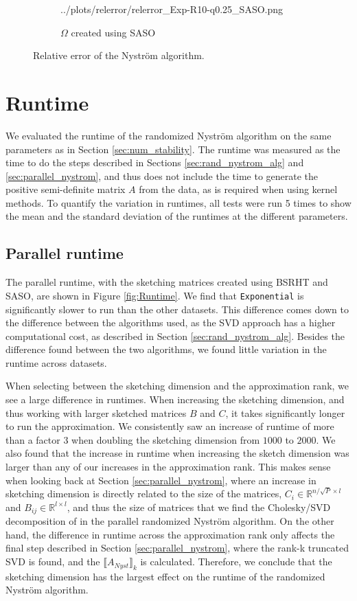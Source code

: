 \documentclass{article}
\theoremstyle{definition}
\begin{document}
\begin{figure}
\begin{subfigure}[t]{0.4\textwidth}
        {../plots/relerror/relerror_Exp-R10-q0.25_SASO.png}
    \caption{$\Omega$ created using SASO}
\end{subfigure}\hfill
\caption{Relative error of the Nyström algorithm.}
\label{fig:RelError}
\end{figure}

\section{Runtime} \label{sec:performance}

We evaluated the runtime of the randomized Nyström algorithm on the same
parameters as in Section \ref{sec:num_stability}. The runtime was measured as
the time to do the steps described in Sections \ref{sec:rand_nystrom_alg} and
\ref{sec:parallel_nystrom}, and thus does not include the time to generate the
positive semi-definite matrix $A$ from the data, as is required when using
kernel methods. To quantify the variation in runtimes, all tests were run 5
times to show the mean and the standard deviation of the runtimes at the
different parameters.\newline


\subsection{Parallel runtime}
The parallel runtime, with the sketching matrices created using BSRHT and SASO,
are shown in Figure \ref{fig:Runtime}. We find that \texttt{Exponential} is
significantly slower to run than the other datasets. This difference comes down
to the difference between the algorithms used, as the SVD approach has a higher
computational cost, as described in Section \ref{sec:rand_nystrom_alg}. Besides
the difference found between the two algorithms, we found little variation in
the runtime across datasets. \newline

When selecting between the sketching dimension and the approximation rank, we
see a large difference in runtimes. When increasing the sketching dimension, and
thus working with larger sketched matrices $B$ and $C$, it takes significantly
longer to run the approximation. We consistently saw an increase of runtime of
more than a factor 3 when doubling the sketching dimension from $1000$ to
$2000$. We also found that the increase in runtime when increasing the sketch
dimension was larger than any of our increases in the approximation rank. This
makes sense when looking back at Section \ref{sec:parallel_nystrom}, where an
increase in sketching dimension is directly related to the size of the matrices,
$C_i\in\mathbb{R}^{n/\!\sqrt{P}\times l}$ and $B_{ij}\in\mathbb{R}^{l\times l}$,
and thus the size of matrices that we find the Cholesky/SVD decomposition of in
the parallel randomized Nyström algorithm. On the other hand, the difference in
runtime across the approximation rank only affects the final step described in
Section \ref{sec:parallel_nystrom}, where the rank-k truncated SVD is found, and
the $\llbracket A_{Nyst}\rrbracket_k$ is calculated. Therefore, we conclude that
the sketching dimension has the largest effect on the runtime of the randomized
Nyström algorithm.
\end{document}
